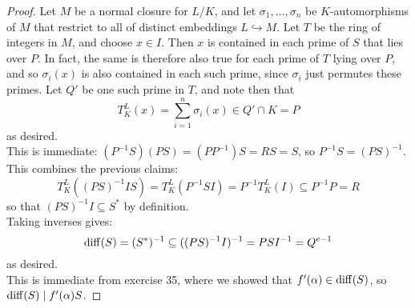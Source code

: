 \begin{proof}
	Let $M$ be a normal closure for $L/K$, and let $\sigma_1,\ldots,\sigma_n$ be $K$-automorphisms of $M$ that restrict to all of distinct embeddings $L \hookrightarrow M$. Let $T$ be the ring of integers in $M$, and choose $x \in I$. Then $x$ is contained in each prime of $S$ that lies over $P$. In fact, the same is therefore also true for each prime of $T$ lying over $P$, and so $\sigma_i(x)$ is also contained in each such prime, since $\sigma_i$ just permutes these primes. Let $Q'$ be one such prime in $T$, and note then that
	\[ T_K^L(x) = \sum_{i=1}^n \sigma_i(x) \in Q' \cap K = P \]
	as desired. \\
	
	This is immediate: $(P^{-1}S)(PS) = (PP^{-1})S = RS = S$, so $P^{-1}S = (PS)^{-1}$. \\
	
	This combines the previous claims:
	\[ T^L_K((PS)^{-1}IS) = T^L_K(P^{-1}SI) = P^{-1}T^L_K(I) \subseteq P^{-1}P = R \]
	so that $(PS)^{-1}I \subseteq S^\ast$ by definition. \\
	
	Taking inverses gives:
	\[ \operatorname{diff}(S) = (S^\ast)^{-1} \subseteq ((PS)^{-1}I)^{-1} = PSI^{-1} = Q^{e-1} \]
	as desired. \\
	
	This is immediate from exercise 35, where we showed that $f'(\alpha) \in \operatorname{diff}(S)$, so $\operatorname{diff}(S) \mid f'(\alpha)S$.
\end{proof}
